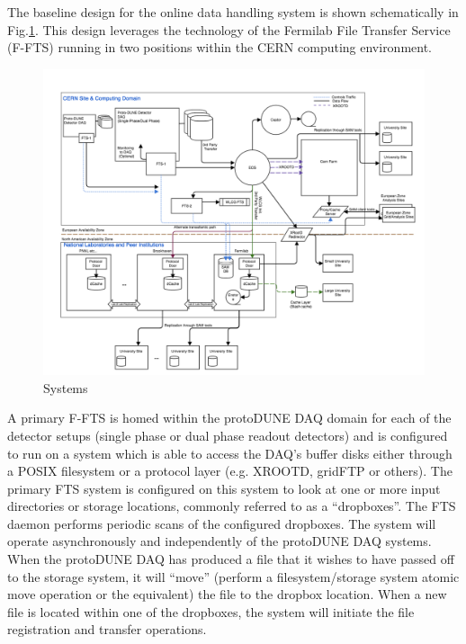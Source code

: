 The baseline design for the online data handling system is shown schematically in Fig.\ref{fig:topology}.  This design leverages the technology of the Fermilab File Transfer Service (F-FTS) running in two positions within the CERN computing environment.


\begin{figure}[h]
  \centering
  \includegraphics[width=1.0\textwidth]{protDune-datahandling-topology.png}
  \caption{Systems}
  \label{fig:topology}
\end{figure}

A primary F-FTS is homed within the protoDUNE DAQ domain for each of the detector setups (single phase or dual phase readout detectors) and is configured to run on a system which is able to access the DAQ’s buffer disks either through a POSIX filesystem or a protocol layer (e.g. XROOTD, gridFTP or others).  The primary FTS system is configured on this system to look at one or more input directories or storage locations, commonly referred to as a “dropboxes”.  The FTS daemon performs periodic scans of the configured dropboxes.  The system will operate asynchronously and independently of the protoDUNE DAQ systems.  When the protoDUNE DAQ has produced a file that it wishes to have passed off to the storage system, it will “move” (perform a filesystem/storage system atomic move operation or the equivalent) the file to the dropbox location. When a new file is located within one of the dropboxes, the system will initiate the file registration and transfer operations.


